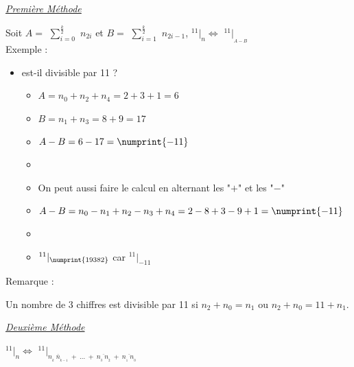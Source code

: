 \documentclass[a4paper, twoside]{article}
\begin{document}
	{\noindent  \underline{\textit{Première Méthode}}}\\

	\par Soit $A =$ {\Large $\sum\limits_{i=0}^{\frac{k}{2}}$} $n_{2i}$ et $B =$ {\Large $\sum\limits_{i=1}^{\frac{k}{2}}$} $n_{2i-1}$, {\huge $ ^{11}|_n \Leftrightarrow$ $^{11}|_{_{A-B}} $}\\

	{ \parindent=0.5cm Exemple : }

	\begin{small}
	\begin{itemize}

		\item[]  est-il divisible par 11 ?
		\begin{itemize}
			\item[] $A = n_0 + n_2 + n_4 = 2 + 3 + 1 = 6$
			\item[] $B = n_1 + n_3 = 8 + 9 = 17$
			\item[] $A-B = 6 - 17 = \numprint{-11}$
			\item[]
			\item[] On peut aussi faire le calcul en alternant les "$+$" et les "$-$"
			\item[] $A-B = n_0 - n_1 + n_2 - n_3 + n_4 = 2 - 8 + 3 - 9 + 1 = \numprint{-11}$
			\item[]
			\item[] {\Large $^{11}|_{\numprint{19382}}$} car {\Large $^{11}|_{-11} $}\\
		\end{itemize}

	\end{itemize}
	\end{small}

	{ \parindent=0.5cm Remarque : }
	\par Un nombre de 3 chiffres est divisible par 11 si $n_2 + n_0 = n_1$ ou $n_2 + n_0 = 11 + n_1$.\\



	\smallskip



	{\noindent  \underline{\textit{Deuxième Méthode}}}

	\begin{center}
		\huge
		$ ^{11}|_n \Leftrightarrow$ $^{11}|_{\overline{n_{_{k}}~n_{_{k - 1}}} ~+~\dots~+~\overline{n_{_3}~n_{_2}}~+~\overline{n_{_1}~n_{_0}}} $
	\end{center}
\end{document}
